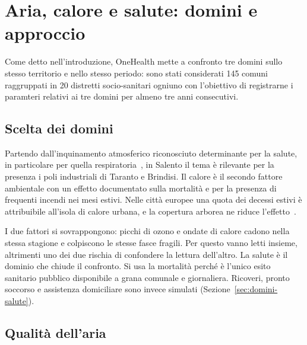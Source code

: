 \chapter{Aria, calore e salute: domini e approccio}
\label{cap:1}

Come detto nell'introduzione, OneHealth mette a confronto tre domini sullo stesso territorio e nello stesso periodo: sono stati considerati 145 comuni raggruppati in 20 distretti socio-sanitari ogniuno con l'obiettivo di registrarne i paramteri relativi ai tre domini per almeno tre anni consecutivi.

\section{Scelta dei domini}
\label{sec:domini-scelta}

Partendo dall'inquinamento atmosferico riconosciuto determinante per la salute, in particolare per quella respiratoria~\cite{salgado2020,hamanaka2025}, in Salento il tema è rilevante per la presenza i poli industriali di Taranto e Brindisi. Il calore è il secondo fattore ambientale con un effetto documentato sulla mortalità e per la presenza di frequenti incendi nei mesi estivi. Nelle città europee una quota dei decessi estivi è attribuibile all'isola di calore urbana, e la copertura arborea ne riduce l'effetto~\cite{iungman2023,huang2023}.

I due fattori si sovrappongono: picchi di ozono e ondate di calore cadono nella stessa stagione e colpiscono le stesse fasce fragili. Per questo vanno letti insieme, altrimenti uno dei due rischia di confondere la lettura dell'altro. La salute è il dominio che chiude il confronto. Si usa la mortalità perché è l'unico esito sanitario pubblico disponibile a grana comunale e giornaliera. Ricoveri, pronto soccorso e assistenza domiciliare sono invece simulati (Sezione~\ref{sec:domini-salute}).

\section{Qualità dell'aria}
\label{sec:domini-aria}

